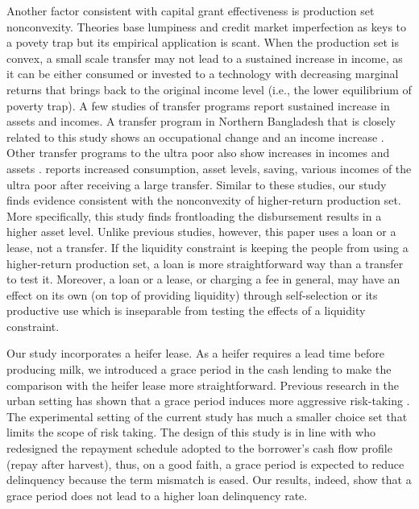 	Another factor consistent with capital grant effectiveness is production set nonconvexity. Theories base lumpiness and credit market imperfection as keys to a povety trap \citep[e.g., ][]{GalorZeira1993} but its empirical application is scant. When the production set is convex, a small scale transfer may not lead to a sustained increase in income, as it can be either consumed or invested to a technology with decreasing marginal returns that brings back to the original income level (i.e., the lower equilibrium of poverty trap). A few studies of transfer programs report sustained increase in assets and incomes. A transfer program in Northern Bangladesh that is closely related to this study shows an occupational change and an income increase \citep{BandieraBRAC2017}. Other transfer programs to the ultra poor also show increases in incomes and assets \citep{Blattman2014, BanerjeeetalScience2015, Blattmanetal2016, HaushoferShapiro2016}. \citet{BanerjeeetalScience2015} reports increased consumption, asset levels, saving, various incomes of the ultra poor after receiving a large transfer. %
	Similar to these studies, our study finds evidence consistent with the nonconvexity of higher-return production set. More specifically, this study finds frontloading the disbursement results in a higher asset level. Unlike previous studies, however, this paper uses a loan or a lease, not a transfer. If the liquidity constraint is keeping the people from using a higher-return production set, a loan is more straightforward way than a transfer to test it. Moreover, a loan or a lease, or charging a fee in general, may have an effect on its own (on top of providing liquidity) through self-selection or its productive use \citep{Ashraf2010, CohenDupas2010} which is inseparable from testing the effects of a liquidity constraint.

	Our study incorporates a heifer lease. As a heifer requires a lead time before producing milk, we introduced a grace period in the cash lending to make the comparison with the heifer lease more straightforward. Previous research  in the urban setting has shown that a grace period induces more aggressive risk-taking \citep{Field2013}. %
	The experimental setting of the current study has much a smaller choice set that limits the scope of risk taking. The design of this study is in line with \citet{Beaman2015} who redesigned the repayment schedule adopted to the borrower's cash flow profile (repay after harvest), thus, on a good faith, a grace period is expected to reduce delinquency because the term mismatch is eased. Our results, indeed, show that a grace period does not lead to a higher loan delinquency rate. 


